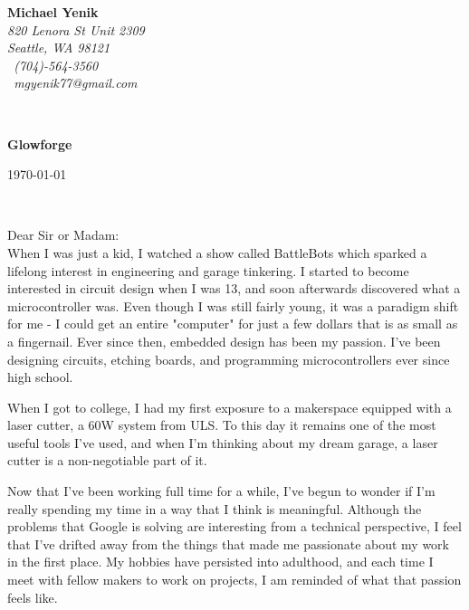 \documentclass[11pt]{article}
\begin{document}
\sffamily   %
\hfill%
\begin{minipage}[t]{.6\textwidth}
\raggedleft%
{\bfseries Michael Yenik}\\[.35ex]
\small\itshape%
820 Lenora St Unit 2309\\
Seattle, WA 98121\\[.35ex]
\Mobilefone~(704)-564-3560\\
\Letter~{mgyenik77@gmail.com}
\end{minipage}\\[1em]
%
\begin{minipage}[t]{.4\textwidth}
\raggedright%
{\bfseries Glowforge}\\[.35ex]
\end{minipage}
\hfill %
\begin{minipage}[t]{.4\textwidth}
\raggedleft %
\today
\end{minipage}\\[2em]
\raggedright
Dear Sir or Madam:\\[1.5em]
%
When I was just a kid, I watched a show called BattleBots which sparked a
lifelong interest in engineering and garage tinkering. I started to become
interested in circuit design when I was 13, and soon afterwards discovered what
a microcontroller was. Even though I was still fairly young, it was a paradigm
shift for me - I could get an entire "computer" for just a few dollars that is
as small as a fingernail. Ever since then, embedded design has been my passion.
I've been designing circuits, etching boards, and programming microcontrollers
ever since high school.

When I got to college, I had my first exposure to a makerspace equipped with a
laser cutter, a 60W system from ULS. To this day it remains one of the most
useful tools I've used, and when I'm thinking about my dream garage, a laser
cutter is a non-negotiable part of it.

Now that I've been working full time for a while, I've begun to wonder if I'm
really spending my time in a way that I think is meaningful. Although the
problems that Google is solving are interesting from a technical perspective, I
feel that I've drifted away from the things that made me passionate about my
work in the first place. My hobbies have persisted into adulthood, and each time
I meet with fellow makers to work on projects, I am reminded of what that
passion feels like.
\end{document}
